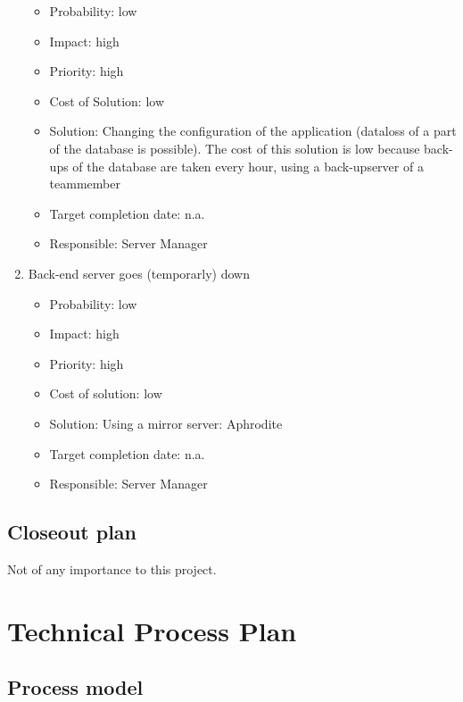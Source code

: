 \documentclass[12pt]{article}
\begin{document}
\begin{enumerate}
  \begin{itemize}
  \itemsep1pt\parskip0pt
  \item
    Probability: low
  \item
    Impact: high
  \item
    Priority: high
  \item
    Cost of Solution: low
  \item
    Solution: Changing the configuration of the application (dataloss of
    a part of the database is possible). The cost of this solution is
    low because back-ups of the database are taken every hour, using a
    back-upserver of a teammember
  \item
    Target completion date: n.a.
  \item
    Responsible: Server Manager
  \end{itemize}
\item
  Back-end server goes (temporarly) down

  \begin{itemize}
  \itemsep1pt\parskip0pt
  \item
    Probability: low
  \item
    Impact: high
  \item
    Priority: high
  \item
    Cost of solution: low
  \item
    Solution: Using a mirror server: Aphrodite
  \item
    Target completion date: n.a.
  \item
    Responsible: Server Manager
  \end{itemize}
\end{enumerate}

\subsection{Closeout plan}\label{closeout-plan}

Not of any importance to this project.

\section{Technical Process Plan}\label{technical-process-plan}

\subsection{Process model}\label{process-model}
\end{document}
